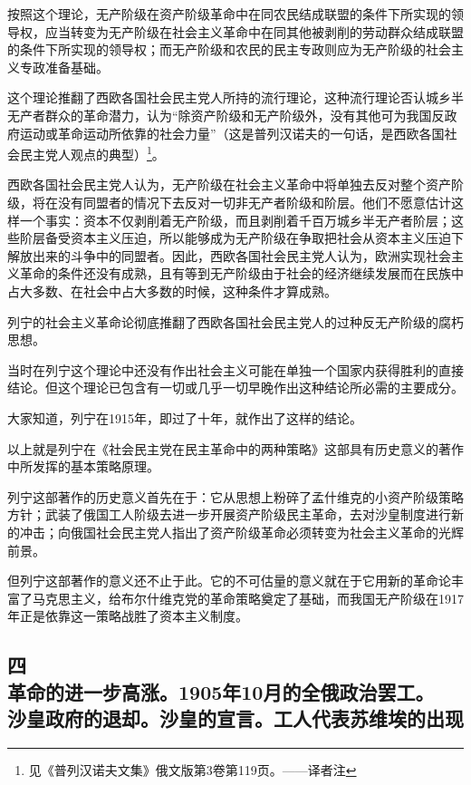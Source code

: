 按照这个理论，无产阶级在资产阶级革命中在同农民结成联盟的条件下所实现的领导权，应当转变为无产阶级在社会主义革命中在同其他被剥削的劳动群众结成联盟的条件下所实现的领导权；而无产阶级和农民的民主专政则应为无产阶级的社会主义专政准备基础。

这个理论推翻了西欧各国社会民主党人所持的流行理论，这种流行理论否认城乡半无产者群众的革命潜力，认为“除资产阶级和无产阶级外，没有其他可为我国反政府运动或革命运动所依靠的社会力量”（这是普列汉诺夫的一句话，是西欧各国社会民主党人观点的典型）\footnote{见《普列汉诺夫文集》俄文版第3卷第119页。——译者注}。

西欧各国社会民主党人认为，无产阶级在社会主义革命中将单独去反对整个资产阶级，将在没有同盟者的情况下去反对一切非无产者阶级和阶层。他们不愿意估计这样一个事实：资本不仅剥削着无产阶级，而且剥削着千百万城乡半无产者阶层；这些阶层备受资本主义压迫，所以能够成为无产阶级在争取把社会从资本主义压迫下解放出来的斗争中的同盟者。因此，西欧各国社会民主党人认为，欧洲实现社会主义革命的条件还没有成熟，且有等到无产阶级由于社会的经济继续发展而在民族中占大多数、在社会中占大多数的时候，这种条件才算成熟。

列宁的社会主义革命论彻底推翻了西欧各国社会民主党人的过种反无产阶级的腐朽思想。

当时在列宁这个理论中还没有作出社会主义可能在单独一个国家内获得胜利的直接结论。但这个理论已包含有一切或几乎一切早晚作出这种结论所必需的主要成分。

大家知道，列宁在1915年，即过了十年，就作出了这样的结论。

以上就是列宁在《社会民主党在民主革命中的两种策略》这部具有历史意义的著作中所发挥的基本策略原理。

列宁这部著作的历史意义首先在于：它从思想上粉碎了孟什维克的小资产阶级策略方针；武装了俄国工人阶级去进一步开展资产阶级民主革命，去对沙皇制度进行新的冲击；向俄国社会民主党人指出了资产阶级革命必须转变为社会主义革命的光辉前景。

但列宁这部著作的意义还不止于此。它的不可估量的意义就在于它用新的革命论丰富了马克思主义，给布尔什维克党的革命策略奠定了基础，而我国无产阶级在1917年正是依靠这一策略战胜了资本主义制度。


\subsection[四\q 革命的进一步高涨。1905年10月的全俄政治罢工。沙皇政府的退却。沙皇的宣言。工人代表苏维埃的出现]{四\\革命的进一步高涨。1905年10月的全俄政治罢工。\\沙皇政府的退却。沙皇的宣言。工人代表苏维埃的出现}


